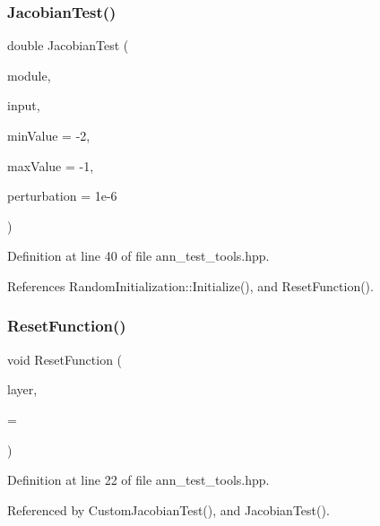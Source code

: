\subsubsection{Jacobian\+Test()}
{\footnotesize\ttfamily double Jacobian\+Test (\begin{DoxyParamCaption}\item[{Module\+Type \&}]{module,  }\item[{arma\+::mat \&}]{input,  }\item[{const double}]{min\+Value = {\ttfamily -\/2},  }\item[{const double}]{max\+Value = {\ttfamily -\/1},  }\item[{const double}]{perturbation = {\ttfamily 1e-\/6} }\end{DoxyParamCaption})}



Definition at line 40 of file ann\+\_\+test\+\_\+tools.\+hpp.



References Random\+Initialization\+::\+Initialize(), and Reset\+Function().

\mbox{\label{ann__test__tools_8hpp_a78777fe2acf29b2cda6cf91dd1d03131}} 
\subsubsection{Reset\+Function()\hspace{0.1cm}{\footnotesize\ttfamily [1/2]}}
{\footnotesize\ttfamily void Reset\+Function (\begin{DoxyParamCaption}\item[{T \&}]{layer,  }\item[{typename std\+::enable\+\_\+if$<$ Has\+Reset\+Check$<$ T, void(T\+::$\ast$)()$>$\+::value $>$\+::type $\ast$}]{ = {} }\end{DoxyParamCaption})}



Definition at line 22 of file ann\+\_\+test\+\_\+tools.\+hpp.



Referenced by Custom\+Jacobian\+Test(), and Jacobian\+Test().

\mbox{\label{ann__test__tools_8hpp_a7f908c6765e1fbb5640310539b265b97}} 

